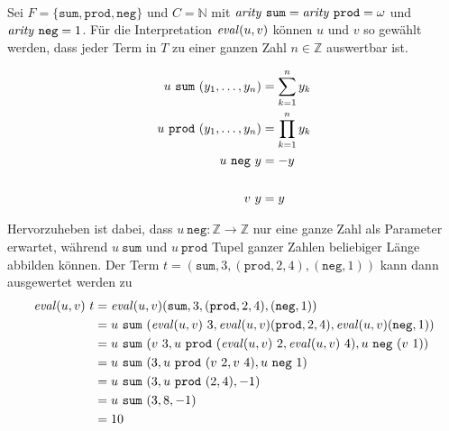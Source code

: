\begin{beispiel}~\\ \label{bEval}
Sei $F = \{\texttt{sum}, \texttt{prod}, \texttt{neg} \}$ und $C = \mathbb{N}$ mit $\mathit{arity}~ \texttt{sum} = \mathit{arity}~ \texttt{prod} = \omega$ und $\mathit{arity}~ \texttt{neg} = 1$.
Für die Interpretation $\mathit{eval}(u, v)$ können $u$ und $v$ so gewählt werden, dass jeder Term in $T$ zu einer ganzen Zahl $n \in \mathbb{Z}$ auswertbar ist.

\begin{equation*}
    \begin{split}
    u~\texttt{sum}  ~({y}_{1}, \dots, {y}_{n}) &=  \sum_{k = 1}^n y_k\\
    u~\texttt{prod} ~({y}_{1}, \dots, {y}_{n}) &= \prod_{k = 1}^n y_k\\
    u~\texttt{neg}~y &= -y\\
    &\\
    v~y &= y
    \end{split}
\end{equation*}

Hervorzuheben ist dabei, dass $u~\texttt{neg} \colon \mathbb Z \rightarrow \mathbb Z$ nur eine ganze Zahl als Parameter erwartet, während $u~\texttt{sum}$ und $u~\texttt{prod}$ Tupel ganzer Zahlen beliebiger Länge abbilden können.
Der Term $t = (\texttt{sum}, 3, (\texttt{prod}, 2, 4), (\texttt{neg}, 1))$ kann dann ausgewertet werden zu 
\begin{equation*}
    \begin{split}
    \mathit{eval}(u, v)~t &= \mathit{eval}(u, v) (\texttt{sum}, 3, (\texttt{prod}, 2, 4), (\texttt{neg}, 1)) \\
    &= u~\texttt{sum}~(\mathit{eval}(u, v)~3, \mathit{eval}(u, v)(\texttt{prod}, 2, 4),  \mathit{eval}(u, v) (\texttt{neg}, 1)) \\
    &= u~\texttt{sum}~(v~3, u~\texttt{prod}~(\mathit{eval}(u, v)~2, \mathit{eval}(u, v)~4), u~\texttt{neg}~ (v~1)) \\
    &= u~\texttt{sum}~(3, u~\texttt{prod}~(v~2, v~4), u~\texttt{neg}~ 1) \\
    &= u~\texttt{sum}~(3, u~\texttt{prod}~(2, 4), -1) \\
    &= u~\texttt{sum}~( 3, 8, -1) \\
    &= 10 \\
    \end{split}
\end{equation*}
\end{beispiel}


